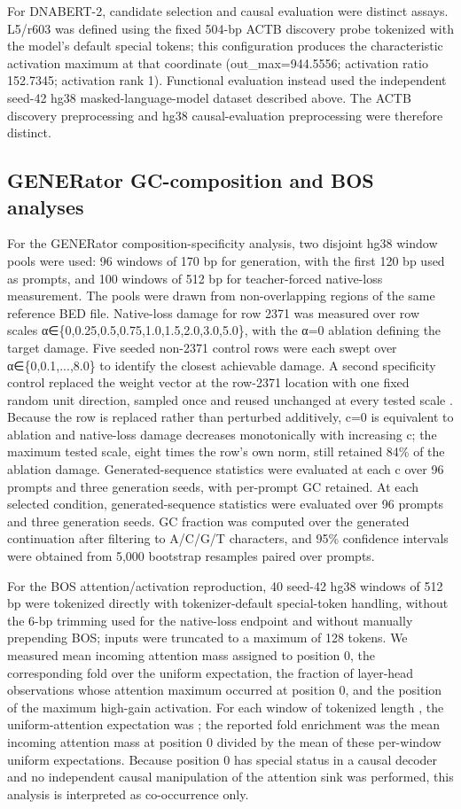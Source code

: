 \documentclass[11pt]{article}
\begin{document}
For DNABERT-2, candidate selection and causal evaluation were distinct assays. L5/r603 was defined using the fixed 504-bp ACTB discovery probe tokenized with the model's default special tokens; this configuration produces the characteristic activation maximum at that coordinate (out\_max=944.5556; activation ratio 152.7345; activation rank 1). Functional evaluation instead used the independent seed-42 hg38 masked-language-model dataset described above. The ACTB discovery preprocessing and hg38 causal-evaluation preprocessing were therefore distinct.

\subsection*{GENERator GC-composition and BOS analyses}
For the GENERator composition-specificity analysis, two disjoint hg38 window pools were used: 96 windows of 170 bp for generation, with the first 120 bp used as prompts, and 100 windows of 512 bp for teacher-forced native-loss measurement. The pools were drawn from non-overlapping regions of the same reference BED file. Native-loss damage for row 2371 was measured over row scales α∈\{0,0.25,0.5,0.75,1.0,1.5,2.0,3.0,5.0\}, with the α=0 ablation defining the target damage. Five seeded non-2371 control rows were each swept over α∈\{0,0.1,...,8.0\} to identify the closest achievable damage. A second specificity control replaced the weight vector at the row-2371 location with one fixed random unit direction, sampled once and reused unchanged at every tested scale . Because the row is replaced rather than perturbed additively, c=0 is equivalent to ablation and native-loss damage decreases monotonically with increasing c; the maximum tested scale, eight times the row’s own norm, still retained 84\% of the ablation damage. Generated-sequence statistics were evaluated at each c over 96 prompts and three generation seeds, with per-prompt GC retained. At each selected condition, generated-sequence statistics were evaluated over 96 prompts and three generation seeds. GC fraction was computed over the generated continuation after filtering to A/C/G/T characters, and 95\% confidence intervals were obtained from 5,000 bootstrap resamples paired over prompts.

For the BOS attention/activation reproduction, 40 seed-42 hg38 windows of 512 bp were tokenized directly with tokenizer-default special-token handling, without the 6-bp trimming used for the native-loss endpoint and without manually prepending BOS; inputs were truncated to a maximum of 128 tokens. We measured mean incoming attention mass assigned to position 0, the corresponding fold over the uniform expectation, the fraction of layer-head observations whose attention maximum occurred at position 0, and the position of the maximum high-gain activation. For each window of tokenized length , the uniform-attention expectation was ; the reported fold enrichment was the mean incoming attention mass at position 0 divided by the mean of these per-window uniform expectations. Because position 0 has special status in a causal decoder and no independent causal manipulation of the attention sink was performed, this analysis is interpreted as co-occurrence only.
\end{document}
